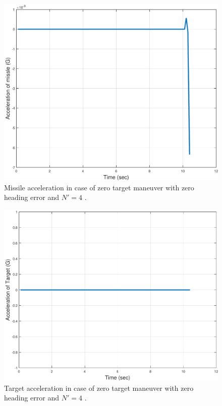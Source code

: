 \begin{figure}[H]
	\centering
	\includegraphics[scale = 0.58]{fig/MissileAccelerationXNT0HE0N4.pdf}
	\caption{Missile acceleration in case of zero target maneuver with zero heading error and $N'=4$ .}
	\label{missile accelerationXNT0HE0N4}
\end{figure}


\begin{figure}[H]
	\centering
	\includegraphics[scale = 0.58]{fig/TargetAccelerationXNT0HE0N4.pdf}
	\caption{Target acceleration in case of zero target maneuver with zero heading error and $N'=4$ .}
	\label{Target accelerationXNT0HE0N4}
\end{figure}



